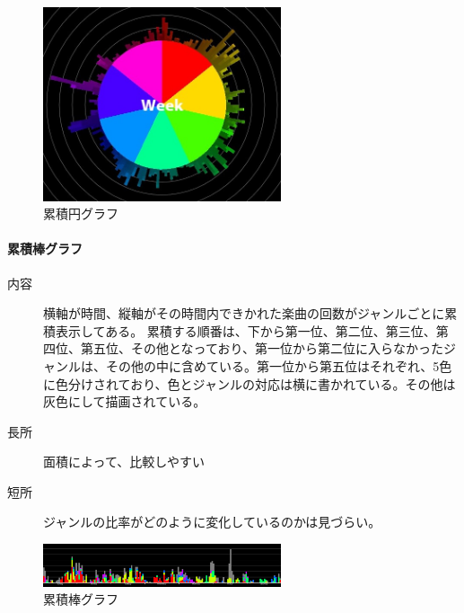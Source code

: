 \documentclass[11pt, twocolumn]{jsarticle}
\begin{document}
\begin{figure}[htbp]
\begin{center}
\includegraphics[width=7cm]{circleGraph.jpg}
\caption{累積円グラフ}
\end{center}
\end{figure}

\paragraph{累積棒グラフ}

\begin{description}
\item[内容]
横軸が時間、縦軸がその時間内できかれた楽曲の回数がジャンルごとに累積表示してある。
累積する順番は、下から第一位、第二位、第三位、第四位、第五位、その他となっており、第一位から第二位に入らなかったジャンルは、その他の中に含めている。第一位から第五位はそれぞれ、5色に色分けされており、色とジャンルの対応は横に書かれている。その他は灰色にして描画されている。
\item[長所]
面積によって、比較しやすい
\item[短所]
ジャンルの比率がどのように変化しているのかは見づらい。
\end{description}



\begin{figure}[htbp]
\begin{center}
\includegraphics[width=7cm]{barGraph.jpg}
\caption{累積棒グラフ}
\end{center}
\end{figure}
\end{document}

